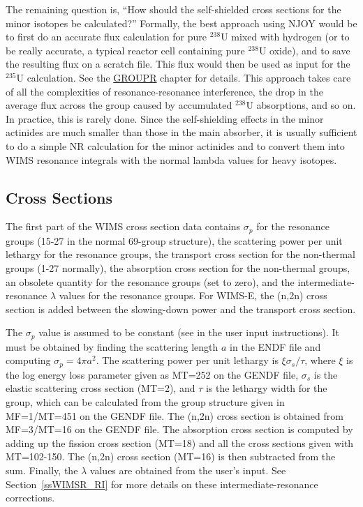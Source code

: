 The remaining question is, ``How should the self-shielded cross
sections for the minor isotopes be calculated?''  Formally, the
best approach using NJOY would be to first do an accurate flux
calculation for pure $^{238}$U mixed with hydrogen (or to be
really accurate, a typical reactor cell containing pure $^{238}$U
oxide), and to save the resulting flux on a scratch file.  This
flux would then be used as input for the $^{235}$U calculation.  See
the \hyperlink{sGROUPRhy}{GROUPR} chapter for details.  This
approach takes care of all
the complexities of resonance-resonance interference, the drop
in the average flux across the group caused by accumulated
$^{238}$U absorptions, and so on.  In practice, this is rarely
done.  Since the self-shielding effects in the minor actinides are
much smaller than those in the main absorber, it is usually sufficient
to do a simple NR calculation for the minor actinides and to
convert them into WIMS resonance integrals with the normal lambda
values for heavy isotopes.

\subsection{Cross Sections}
\label{ssWIMSR_xs}

The first part of the WIMS cross section data contains $\sigma_p$
for the resonance groups (15-27 in the normal 69-group structure),
the scattering power per unit lethargy for the resonance groups,
the transport cross section for the non-thermal groups (1-27 normally),
the absorption cross section for the non-thermal groups, an obsolete
quantity for the resonance groups (set to zero), and the
intermediate-resonance $\lambda$ values for the resonance groups.
For WIMS-E, the (n,2n) cross section is added between the
slowing-down power and the transport cross section.

The $\sigma_p$ value is assumed to be constant (see  in the
user input instructions).  It must be obtained by finding the scattering
length $a$ in the ENDF file and computing $\sigma_p=4\pi a^2$.  The
scattering power per unit lethargy is $\xi\sigma_s/\tau$, where $\xi$
is the log energy loss parameter given as MT=252 on the GENDF file,
$\sigma_s$ is the elastic scattering cross section (MT=2), and $\tau$
is the lethargy width for the group, which can be calculated from the
group structure given in MF=1/MT=451 on the GENDF file.  The (n,2n)
cross section is obtained from MF=3/MT=16 on the GENDF file.  The
absorption cross section is computed by adding up the fission
cross section (MT=18) and all the cross sections given with
MT=102-150.  The (n,2n) cross section (MT=16) is then subtracted
from the sum.  Finally, the $\lambda$ values are obtained from the
user's input.  See Section~\ref{ssWIMSR_RI} for more details on these
intermediate-resonance corrections.

